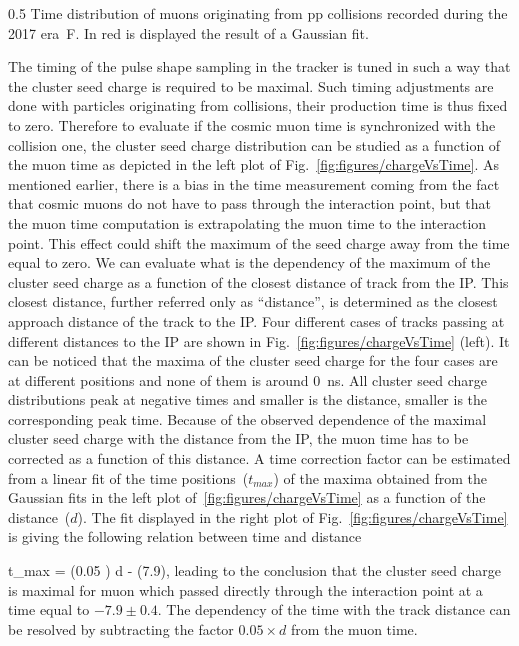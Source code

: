                  {0.5}       %
                 { Time distribution of muons originating from pp collisions recorded during the 2017 era~F. In red is displayed the result of a Gaussian fit.  }


The timing of the pulse shape sampling in the tracker is tuned in such a way that the cluster seed charge is required to be maximal. Such timing adjustments are done with particles originating from collisions, their production time is thus fixed to zero. Therefore to evaluate if the cosmic muon time is synchronized with the collision one, the cluster seed charge distribution can be studied as a function of the muon time as depicted in the left plot of Fig.~\ref{fig:figures/chargeVsTime}. As mentioned earlier, there is a bias in the time measurement coming from the fact that cosmic muons do not have to pass through the interaction point, but that the muon time computation is extrapolating the muon time to the interaction point. This effect could shift the maximum of the seed charge away from the time equal to zero. We can evaluate what is the dependency of the maximum of the cluster seed charge as a function of the closest distance of track from the IP. This closest distance, further referred only as ``distance'', is determined as the closest approach distance of the track to the IP. Four different cases of tracks passing at different distances to the IP are shown in Fig.~\ref{fig:figures/chargeVsTime} (left).  It can be noticed that the maxima of the cluster seed charge for the four cases are at different positions and none of them is around 0~ns. All cluster seed charge distributions peak at negative times and smaller is the distance, smaller is the corresponding peak time. Because of the observed dependence of the maximal cluster seed charge with the distance from the IP, the muon time has to be corrected as a function of this distance. A time correction factor can be estimated from a linear fit of the time positions~($t_{max}$) of the maxima obtained from the Gaussian fits in the left plot of~\ref{fig:figures/chargeVsTime} as a function of the distance~($d$). The fit displayed in the right plot of Fig.~\ref{fig:figures/chargeVsTime} is giving the following relation between time and distance

{
t_{max} = (0.05 ) \times d  - (7.9),
}
leading to the conclusion that the cluster seed charge is maximal for muon which passed directly through the interaction point at a time equal to $-7.9 \pm 0.4 $. The dependency of the time with the track distance can be resolved by subtracting the factor $ 0.05 \times d $ from the muon time.


